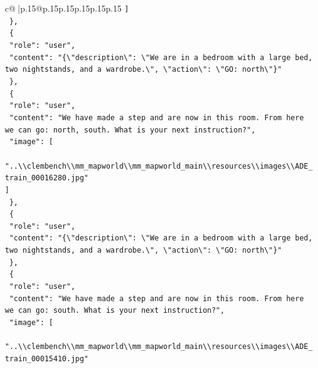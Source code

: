 \documentclass{article}
\begin{document}
{\begin{supertabular}{c@{$\;$}|p{.15\linewidth}@{}p{.15\linewidth}p{.15\linewidth}p{.15\linewidth}p{.15\linewidth}p{.15\linewidth}}
{{{\texttt{    {]}} \\
\texttt{  \},} \\
\texttt{  \{} \\
\texttt{    "role": "user",} \\
\texttt{    "content": "\{\textbackslash{}"description\textbackslash{}": \textbackslash{}"We are in a bedroom with a large bed, two nightstands, and a wardrobe.\textbackslash{}", \textbackslash{}"action\textbackslash{}": \textbackslash{}"GO: north\textbackslash{}"\}"} \\
\texttt{  \},} \\
\texttt{  \{} \\
\texttt{    "role": "user",} \\
\texttt{    "content": "We have made a step and are now in this room. From here we can go: north, south. What is your next instruction?",} \\
\texttt{    "image": {[}} \\
\texttt{      "..\textbackslash{}\textbackslash{}clembench\textbackslash{}\textbackslash{}mm\_mapworld\textbackslash{}\textbackslash{}mm\_mapworld\_main\textbackslash{}\textbackslash{}resources\textbackslash{}\textbackslash{}images\textbackslash{}\textbackslash{}ADE\_train\_00016280.jpg"} \\
\texttt{    {]}} \\
\texttt{  \},} \\
\texttt{  \{} \\
\texttt{    "role": "user",} \\
\texttt{    "content": "\{\textbackslash{}"description\textbackslash{}": \textbackslash{}"We are in a bedroom with a large bed, two nightstands, and a wardrobe.\textbackslash{}", \textbackslash{}"action\textbackslash{}": \textbackslash{}"GO: north\textbackslash{}"\}"} \\
\texttt{  \},} \\
\texttt{  \{} \\
\texttt{    "role": "user",} \\
\texttt{    "content": "We have made a step and are now in this room. From here we can go: south. What is your next instruction?",} \\
\texttt{    "image": {[}} \\
\texttt{      "..\textbackslash{}\textbackslash{}clembench\textbackslash{}\textbackslash{}mm\_mapworld\textbackslash{}\textbackslash{}mm\_mapworld\_main\textbackslash{}\textbackslash{}resources\textbackslash{}\textbackslash{}images\textbackslash{}\textbackslash{}ADE\_train\_00015410.jpg"} \\
}}}
\end{supertabular}}
\end{document}
